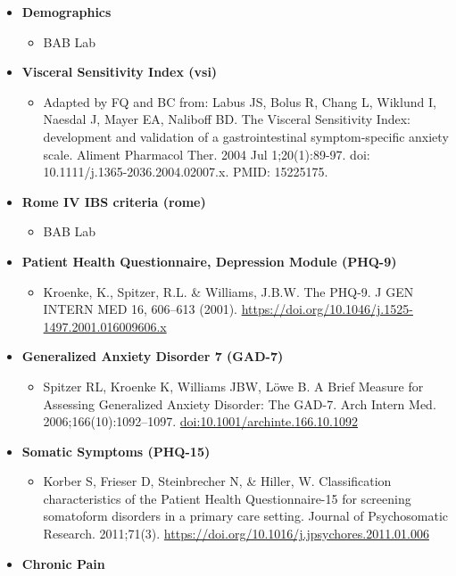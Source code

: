 \documentclass[
]{book}
\providecommand{\tightlist}{%
  \setlength{\itemsep}{0pt}\setlength{\parskip}{0pt}}
\begin{document}
\begin{itemize}
\tightlist
\item
  \textbf{Demographics}

  \begin{itemize}
  \tightlist
  \item
    BAB Lab
  \end{itemize}
\item
  \textbf{Visceral Sensitivity Index (vsi)}

  \begin{itemize}
  \tightlist
  \item
    Adapted by FQ and BC from: Labus JS, Bolus R, Chang L, Wiklund I, Naesdal J, Mayer EA, Naliboff BD. The Visceral Sensitivity Index: development and validation of a gastrointestinal symptom-specific anxiety scale. Aliment Pharmacol Ther. 2004 Jul 1;20(1):89-97. doi: 10.1111/j.1365-2036.2004.02007.x. PMID: 15225175.
  \end{itemize}
\item
  \textbf{Rome IV IBS criteria (rome)}

  \begin{itemize}
  \tightlist
  \item
    BAB Lab
  \end{itemize}
\item
  \textbf{Patient Health Questionnaire, Depression Module (PHQ-9)}

  \begin{itemize}
  \tightlist
  \item
    Kroenke, K., Spitzer, R.L. \& Williams, J.B.W. The PHQ-9. J GEN INTERN MED 16, 606--613 (2001). \url{https://doi.org/10.1046/j.1525-1497.2001.016009606.x}
  \end{itemize}
\item
  \textbf{Generalized Anxiety Disorder 7 (GAD-7)}

  \begin{itemize}
  \tightlist
  \item
    Spitzer RL, Kroenke K, Williams JBW, Löwe B. A Brief Measure for Assessing Generalized Anxiety Disorder: The GAD-7. Arch Intern Med. 2006;166(10):1092--1097. \url{doi:10.1001/archinte.166.10.1092}
  \end{itemize}
\item
  \textbf{Somatic Symptoms (PHQ-15)}

  \begin{itemize}
  \tightlist
  \item
    Korber S, Frieser D, Steinbrecher N, \& Hiller, W. Classification characteristics of the Patient Health Questionnaire-15 for screening somatoform disorders in a primary care setting. Journal of Psychosomatic Research. 2011;71(3). \url{https://doi.org/10.1016/j.jpsychores.2011.01.006}
  \end{itemize}
\item
  \textbf{Chronic Pain}


\end{itemize}
\end{document}
